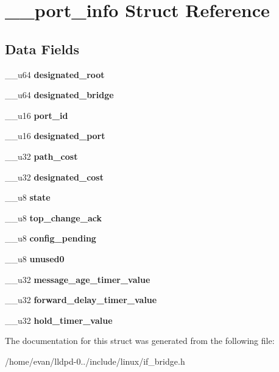 \section{\-\_\-\-\_\-port\-\_\-info \-Struct \-Reference}
\label{struct____port__info}
\subsection*{\-Data \-Fields}
\begin{DoxyCompactItemize}
\item 
\-\_\-\-\_\-u64 {\bfseries designated\-\_\-root}\label{struct____port__info_a1d5e0519b1529436dcb61c6a85fa1f03}

\item 
\-\_\-\-\_\-u64 {\bfseries designated\-\_\-bridge}\label{struct____port__info_a95670b348b3fe42e4ec70e2c4f79d307}

\item 
\-\_\-\-\_\-u16 {\bfseries port\-\_\-id}\label{struct____port__info_af21a8f8e5124e5f677f033f25a362ee2}

\item 
\-\_\-\-\_\-u16 {\bfseries designated\-\_\-port}\label{struct____port__info_a85df32347122fdb6549e9e3c962dad94}

\item 
\-\_\-\-\_\-u32 {\bfseries path\-\_\-cost}\label{struct____port__info_af94f3afdaa29e0d6b49162b9020adfa1}

\item 
\-\_\-\-\_\-u32 {\bfseries designated\-\_\-cost}\label{struct____port__info_a363d37e96dbe374004f6e19f17b691e4}

\item 
\-\_\-\-\_\-u8 {\bfseries state}\label{struct____port__info_aa00559b8660904e13c97d9773d26a064}

\item 
\-\_\-\-\_\-u8 {\bfseries top\-\_\-change\-\_\-ack}\label{struct____port__info_a3ca9e096a7813a8e4aab9a364a260532}

\item 
\-\_\-\-\_\-u8 {\bfseries config\-\_\-pending}\label{struct____port__info_a9f1e5ea53fba0eaab870369cd6fd192b}

\item 
\-\_\-\-\_\-u8 {\bfseries unused0}\label{struct____port__info_ac2dc892534620410ceb6dd9a77c2809f}

\item 
\-\_\-\-\_\-u32 {\bfseries message\-\_\-age\-\_\-timer\-\_\-value}\label{struct____port__info_a372798713f7a6d9dd3e562ff037aba4e}

\item 
\-\_\-\-\_\-u32 {\bfseries forward\-\_\-delay\-\_\-timer\-\_\-value}\label{struct____port__info_a6a602dc82f0f6c03fa6e67e70d2d4e9c}

\item 
\-\_\-\-\_\-u32 {\bfseries hold\-\_\-timer\-\_\-value}\label{struct____port__info_a3ac4f18235f03ea3cf78f07b43f20205}

\end{DoxyCompactItemize}


\-The documentation for this struct was generated from the following file\-:\begin{DoxyCompactItemize}
\item 
/home/evan/lldpd-\/0../include/linux/if\-\_\-bridge.\-h\end{DoxyCompactItemize}
